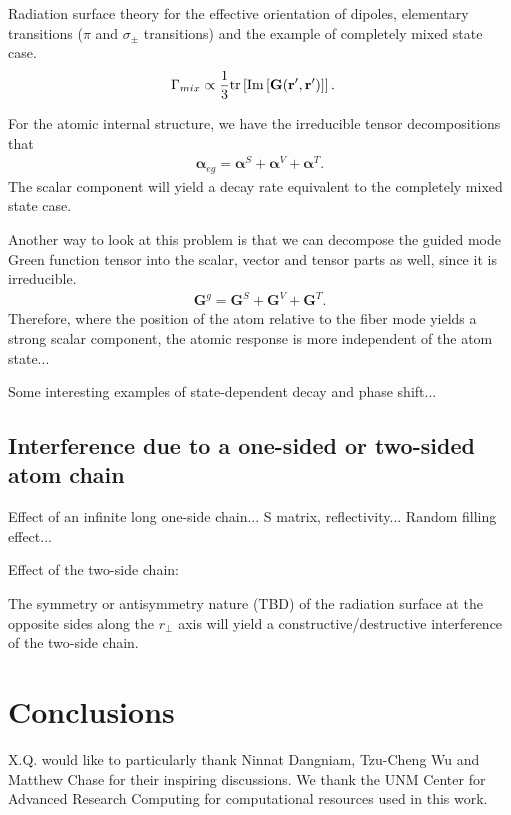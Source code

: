 \documentclass[preprint,pra,onecolumn]{revtex4-1} %
\begin{document}
Radiation surface theory for the effective orientation of dipoles, elementary transitions ($ \pi $ and $ \sigma_\pm $ transitions) and the example of completely mixed state case. 
\begin{align}
\Gamma_{mix} &\propto \frac{1}{3} \mathrm{tr}\left[ \mathrm{Im}\left[\mathbf{G}(\mathbf{r}',\mathbf{r}')\right] \right].
\end{align}

For the atomic internal structure, we have the irreducible tensor decompositions that 
\begin{align}
\boldsymbol{\alpha}_{eg} = \boldsymbol{\alpha}^S + \boldsymbol{\alpha}^V + \boldsymbol{\alpha}^T.
\end{align}
The scalar component will yield a decay rate equivalent to the completely mixed state case. 

Another way to look at this problem is that we can decompose the guided mode Green function tensor into the scalar, vector and tensor parts as well, since it is irreducible.
\begin{align}
\mathbf{G}^g=\mathbf{G}^S+\mathbf{G}^V+\mathbf{G}^T.
\end{align}
Therefore, where the position of the atom relative to the fiber mode yields a strong scalar component, the atomic response is more independent of the atom state... 

Some interesting examples of state-dependent decay and phase shift...



\subsection{Interference due to a one-sided or two-sided atom chain}
Effect of an infinite long one-side chain... S matrix, reflectivity... Random filling effect...

Effect of the two-side chain:

The symmetry or antisymmetry nature (TBD) of the radiation surface at the opposite sides along the $ r\!_\perp $ axis will yield a constructive/destructive interference of the two-side chain. 

\section{Conclusions}

\begin{acknowledgments}
X.Q. would like to particularly thank Ninnat Dangniam, Tzu-Cheng Wu and Matthew Chase for their inspiring discussions. We thank the UNM Center for Advanced Research Computing for computational resources used in this work.
\end{acknowledgments}
\end{document}
